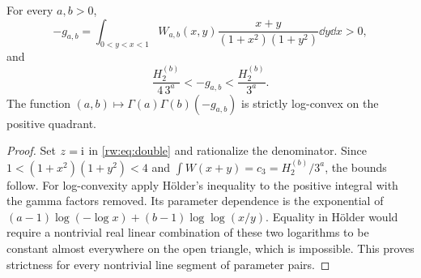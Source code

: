 \begin{corollary}
\label{rw:cor:gaussian}
For every $a,b>0$,
\begin{equation}\label{rw:eq:gaussianpositive}
 -g_{a,b}=\int_{0<y<x<1}W_{a,b}(x,y)
       \frac{x+y}{(1+x^2)(1+y^2)}\dd y\dd x>0,
\end{equation}
and
\begin{equation}\label{rw:eq:gaussianbounds}
 \frac{H_2^{(b)}}{4\,3^a}<-g_{a,b}<\frac{H_2^{(b)}}{3^a}.
\end{equation}
The function $(a,b)\mapsto\Gamma(a)\Gamma(b)(-g_{a,b})$ is strictly
log-convex on the positive quadrant.
\end{corollary}
\begin{proof}
Set $z=\mathrm{i}$ in \eqref{rw:eq:double} and rationalize the denominator.
Since $1<(1+x^2)(1+y^2)<4$ and
$\int W(x+y)=c_3=H_2^{(b)}/3^a$, the bounds follow.
For log-convexity apply H\"older's inequality to the positive integral
with the gamma factors removed. Its parameter dependence is the
exponential of
$(a-1)\log(-\log x)+(b-1)\log\log(x/y)$.
Equality in H\"older would require a nontrivial real linear combination
of these two logarithms to be constant almost everywhere on the open
triangle, which is impossible. This proves strictness for every
nontrivial line segment of parameter pairs.
\end{proof}

